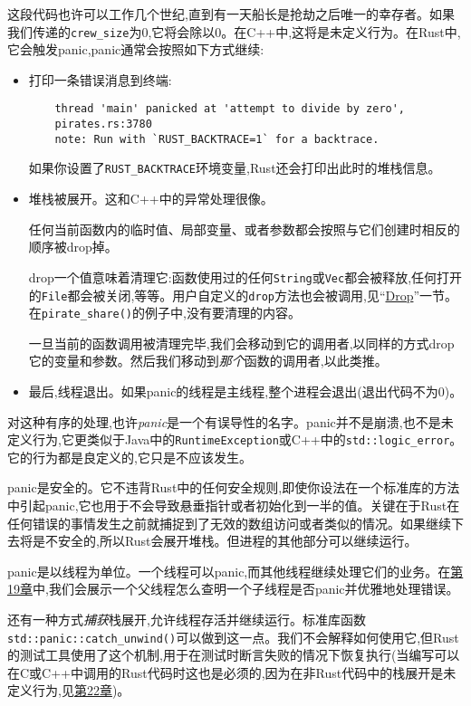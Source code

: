这段代码也许可以工作几个世纪,直到有一天船长是抢劫之后唯一的幸存者。如果我们传递的\texttt{crew\_size}为0,它将会除以0。在C++中,这将是未定义行为。在Rust中,它会触发panic,panic通常会按照如下方式继续:
\begin{itemize}
    \item 打印一条错误消息到终端:
    \begin{verbatim}
    thread 'main' panicked at 'attempt to divide by zero',
    pirates.rs:3780
    note: Run with `RUST_BACKTRACE=1` for a backtrace.
    \end{verbatim}

    如果你设置了\texttt{RUST\_BACKTRACE}环境变量,Rust还会打印出此时的堆栈信息。

    \item 堆栈被展开。这和C++中的异常处理很像。
    
    任何当前函数内的临时值、局部变量、或者参数都会按照与它们创建时相反的顺序被drop掉。

    drop一个值意味着清理它:函数使用过的任何\texttt{String}或\texttt{Vec}都会被释放,任何打开的\texttt{File}都会被关闭,等等。用户自定义的\texttt{drop}方法也会被调用,见“\hyperref[drop]{Drop}”一节。在\texttt{pirate\_share()}的例子中,没有要清理的内容。

    一旦当前的函数调用被清理完毕,我们会移动到它的调用者,以同样的方式drop它的变量和参数。然后我们移动到\emph{那个}函数的调用者,以此类推。

    \item 最后,线程退出。如果panic的线程是主线程,整个进程会退出(退出代码不为0)。
\end{itemize}

对这种有序的处理,也许\emph{panic}是一个有误导性的名字。panic并不是崩溃,也不是未定义行为,它更类似于Java中的\texttt{RuntimeException}或C++中的\texttt{std::logic\_error}。它的行为都是良定义的,它只是不应该发生。

panic是安全的。它不违背Rust中的任何安全规则,即使你设法在一个标准库的方法中引起panic,它也用于不会导致悬垂指针或者初始化到一半的值。关键在于Rust在任何错误的事情发生之前就捕捉到了无效的数组访问或者类似的情况。如果继续下去将是不安全的,所以Rust会展开堆栈。但进程的其他部分可以继续运行。

panic是以线程为单位。一个线程可以panic,而其他线程继续处理它们的业务。在\hyperref[ch19]{第19章}中,我们会展示一个父线程怎么查明一个子线程是否panic并优雅地处理错误。

还有一种方式\emph{捕获}栈展开,允许线程存活并继续运行。标准库函数\\
\texttt{std::panic::catch\_unwind()}可以做到这一点。我们不会解释如何使用它,但Rust的测试工具使用了这个机制,用于在测试时断言失败的情况下恢复执行(当编写可以在C或C++中调用的Rust代码时这也是必须的,因为在非Rust代码中的栈展开是未定义行为,见\hyperref[ch22]{第22章})。

